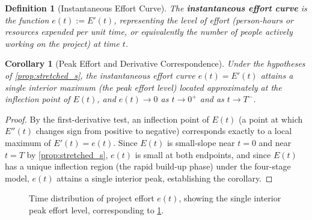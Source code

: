 \documentclass[12pt, a4paper]{report}
\theoremstyle{engnotes}
\newtheorem{corollary}{Corollary}[section]
\newtheorem{defn}{Definition}[section]
\begin{document}
\begin{defn}[Instantaneous Effort Curve]\label{def:instantaneous_effort}
    The \textbf{instantaneous effort curve} is the function $e(t) := E'(t)$, representing the level of effort (person-hours or resources expended per unit time, or equivalently the number of people actively working on the project) at time $t$.
\end{defn}

\begin{corollary}[Peak Effort and Derivative Correspondence]\label{cor:peak_effort}
    Under the hypotheses of \cref{prop:stretched_s}, the instantaneous effort curve $e(t) = E'(t)$ attains a single interior maximum (the \emph{peak effort level}) located approximately at the inflection point of $E(t)$, and $e(t) \to 0$ as $t \to 0^+$ and as $t \to T^-$.
\end{corollary}

\begin{proof}
    By the first-derivative test, an inflection point of $E(t)$ (a point at which $E''(t)$ changes sign from positive to negative) corresponds exactly to a local maximum of $E'(t) = e(t)$. Since $E(t)$ is small-slope near $t=0$ and near $t=T$ by \cref{prop:stretched_s}, $e(t)$ is small at both endpoints, and since $E(t)$ has a unique inflection region (the rapid build-up phase) under the four-stage model, $e(t)$ attains a single interior peak, establishing the corollary.
\end{proof}

\begin{figure}[H]
    \centering
    \caption{Time distribution of project effort $e(t)$, showing the single interior peak effort level, corresponding to \cref{cor:peak_effort}.}
    \label{fig:effort_distribution}
\end{figure}
\end{document}
